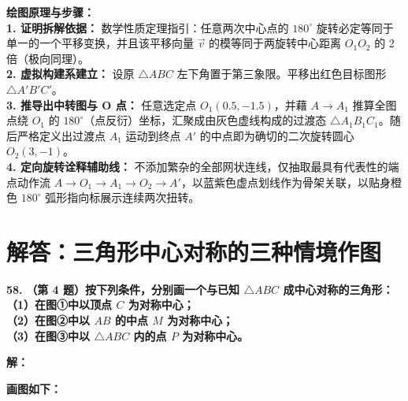 \vspace{0.4cm}
{\small\color{blue!70!black}
\textbf{绘图原理与步骤：}\\
\textbf{1. 证明拆解依据：} 数学性质定理指引：任意两次中心点的 $180^\circ$ 旋转必定等同于单一的一个平移变换，并且该平移向量 $\vec{v}$ 的模等同于两旋转中心距离 $O_1 O_2$ 的 2 倍（极向同理）。\\
\textbf{2. 虚拟构建系建立：} 设原 $\triangle ABC$ 左下角置于第三象限。平移出红色目标图形 $\triangle A'B'C'$。\\
\textbf{3. 推导出中转图与 O 点：} 任意选定点 $O_1(0.5, -1.5)$，并藉 $A \to A_1$ 推算全图点绕 $O_1$ 的 $180^\circ$（点反衍）坐标，汇聚成由灰色虚线构成的过渡态 $\triangle A_1B_1C_1$。随后严格定义出过渡点 $A_1$ 运动到终点 $A'$ 的中点即为确切的二次旋转圆心 $O_2(3,-1)$。\\
\textbf{4. 定向旋转诠释辅助线：} 不添加繁杂的全部网状连线，仅抽取最具有代表性的端点动作流 $A \to O_1 \to A_1 \to O_2 \to A'$，以蓝紫色虚点划线作为骨架关联，以贴身橙色 $180^\circ$ 弧形指向标展示连续两次扭转。
}

\newpage



\section{解答：三角形中心对称的三种情境作图}

\vspace{0.6cm}

\textbf{\LARGE 58.} \textbf{（第 4 题）按下列条件，分别画一个与已知 $\triangle ABC$ 成中心对称的三角形：\\
（1）在图①中以顶点 $C$ 为对称中心；\\
（2）在图②中以 $AB$ 的中点 $M$ 为对称中心；\\
（3）在图③中以 $\triangle ABC$ 内的点 $P$ 为对称中心。}

\vspace{0.4cm}
\textbf{解：}

\textbf{画图如下：}

